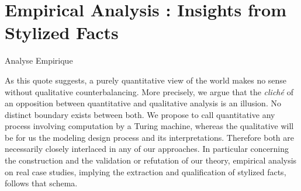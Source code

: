 


\section{Empirical Analysis : Insights from Stylized Facts}{Analyse Empirique} %

\label{ch:empirical} %





\bigskip












As this quote suggests, a purely quantitative view of the world makes no sense without qualitative counterbalancing. More precisely, we argue that the \textit{clich{\'e}} of an opposition between quantitative and qualitative analysis is an illusion. No distinct boundary exists between both. We propose to call quantitative any process involving computation by a Turing machine, whereas the qualitative will be for us the modeling design process and its interpretations. 
 Therefore both are necessarily closely interlaced in any of our approaches. In particular concerning the construction and the validation or refutation of our theory, empirical analysis on real case studies, implying the extraction and qualification of stylized facts, follows that schema.

